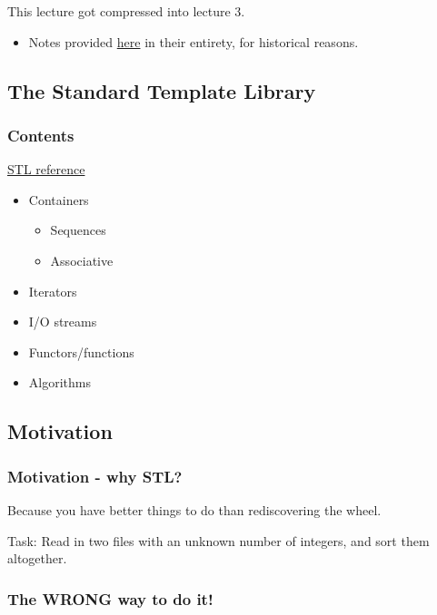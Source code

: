 This lecture got compressed into lecture 3.

\begin{itemize}
\itemsep1pt\parskip0pt
\item
  Notes provided \href{sec01Intro}{here} in their entirety, for
  historical reasons.
\end{itemize}

\subsection{The Standard Template
Library}\label{the-standard-template-library}

\subsubsection{Contents}\label{contents}

\href{http://www.cplusplus.com/reference/}{STL reference}

\begin{itemize}
\itemsep1pt\parskip0pt
\item
  Containers

  \begin{itemize}
  \itemsep1pt\parskip0pt
  \item
    Sequences
  \item
    Associative
  \end{itemize}
\item
  Iterators
\item
  I/O streams
\item
  Functors/functions
\item
  Algorithms
\end{itemize}

\subsection{Motivation}\label{motivation}

\subsubsection{Motivation - why STL?}\label{motivation---why-stl}

Because you have better things to do than rediscovering the wheel.

Task: Read in two files with an unknown number of integers, and sort
them altogether.

\subsubsection{The \textbf{WRONG} way to do
it!}\label{the-wrong-way-to-do-it}

